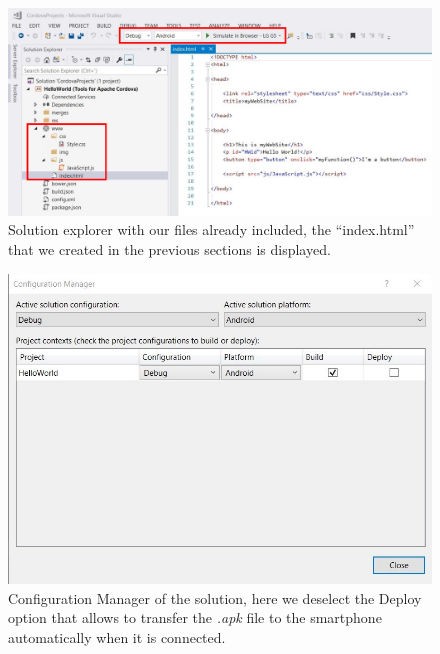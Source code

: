\begin{figure}
    \centering
    \includegraphics[width= \textwidth]{Figures/Cordova4}
    \caption{Solution explorer with our files already included, the ``index.html'' that we created in the previous sections is displayed.}
    \label{fig:Cordova4}
\end{figure}

\begin{figure}
    \centering
    \includegraphics[width=0.8 \textwidth]{Figures/Cordova5}
    \caption{Configuration Manager of the solution, here we deselect the Deploy option that allows to transfer the \textit{.apk} file to the smartphone automatically when it is connected.}
    \label{fig:Cordova5}
\end{figure}

